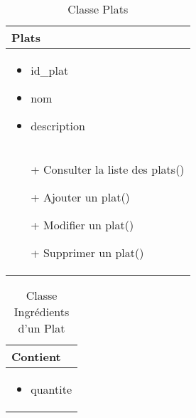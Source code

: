 \begin{table}[H]
    \begin{center}
        \begin{tabular}{|Z{5cm}|}
            \hline
            \textbf{Plats}\\
            \hline
            \begin{itemize}
                \item id\_plat
                \item nom
                \item description
            \end{itemize}\\
            \hline
            \begin{itemize}
                \item[+] Consulter la liste des plats()
                \item[+] Ajouter un plat()
                \item[+] Modifier un plat()
                \item[+] Supprimer un plat()
            \end{itemize}
            \\
            \hline
        \end{tabular}	
        \caption{Classe Plats}
    \end{center}
\end{table}

\begin{table}[H]
    \begin{center}
        \begin{tabular}{|Z{5cm}|}
            \hline
            \textbf{Contient}\\
            \hline
            \begin{itemize}
                \item quantite
            \end{itemize}\\
            \hline
        \end{tabular}	
        \caption{Classe Ingrédients d'un Plat}
    \end{center}
\end{table}

